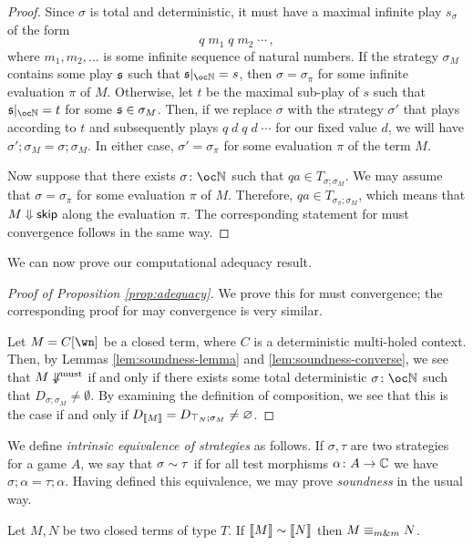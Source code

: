 \documentclass[sigplan,9pt,review]{acmart}\settopmatter{printfolios=true,printccs=false,printacmref=false}
\begin{document}
\begin{proof}
  Since $\sigma$ is total and deterministic, it must have a maximal infinite play $s_\sigma$ of the form
  \[
    q\;m_1\;q\;m_2\;\cdots\,,
    \]
  where $m_1,m_2,\dots$ is some infinite sequence of natural numbers.  
  If the strategy $\sigma_M$ contains some play $\mathfrak s$ such that $\s\vert_{\oc\bN}=s$, then $\sigma=\sigma_\pi$ for some infinite evaluation $\pi$ of $M$.  
  Otherwise, let $t$ be the maximal sub-play of $s$ such that $\s\vert_{\oc\bN}=t$ for some $\mathfrak s\in\sigma_M$.  
  Then, if we replace $\sigma$ with the strategy $\sigma'$ that plays according to $t$ and subsequently plays $q\;d\;q\;d\;\cdots$ for our fixed value $d$, we will have $\sigma';\sigma_M=\sigma;\sigma_M$.  
  In either case, $\sigma'=\sigma_\pi$ for some evaluation $\pi$ of the term $M$.

  Now suppose that there exists $\sigma\from\oc\bN$ such that $qa\in T_{\sigma;\sigma_M}$.  
  We may assume that $\sigma=\sigma_\pi$ for some evaluation $\pi$ of $M$.  
  Therefore, $qa\in T_{\sigma_\pi;\sigma_M}$, which means that $M\Downarrow{\mathsf{skip}}$ along the evaluation $\pi$.  
  The corresponding statement for must convergence follows in the same way.
\end{proof}

We can now prove our computational adequacy result.

\begin{proof}[Proof of Proposition \ref{prop:adequacy}]
  We prove this for must convergence; the corresponding proof for may convergence is very similar.

  Let $M=C[\wn]$ be a closed term, where $C$ is a deterministic multi-holed context.  
  Then, by Lemmas \ref{lem:soundness-lemma} and \ref{lem:soundness-converse}, we see that $M\not\Downarrow^{\text{must}}$ if and only if there exists some total deterministic $\sigma\from\oc\bN$ such that $D_{\sigma;\sigma_M}\ne\emptyset$.  
  By examining the definition of composition, we see that this is the case if and only if $D_{\left\llbracket M\right\rrbracket}=D_{\top_N;\sigma_M}\ne\varnothing$.
\end{proof}

We define \emph{intrinsic equivalence of strategies} as follows.  
If $\sigma,\tau$ are two strategies for a game $A$, we say that $\sigma\sim\tau$ if for all test morphisms $\alpha\colon A \to \mathbb{C}$ we have $\sigma;\alpha=\tau;\alpha$.  
Having defined this equivalence, we may prove \emph{soundness} in the usual way.

\begin{theorem}[Soundness]
  Let $M,N$ be two closed terms of type $T$.  
  If $\left\llbracket M\right\rrbracket\sim\left\llbracket N\right\rrbracket$ then $M\equiv_{m\&m} N$.  
\end{theorem}
\end{document}
